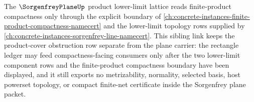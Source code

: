 The $\SorgenfreyPlaneUp$ product lower-limit lattice reads finite-product compactness only through the explicit boundary of \autoref{ch:concrete-instances-finite-product-compactness-namecert} and the lower-limit topology rows supplied by \autoref{ch:concrete-instances-sorgenfrey-line-namecert}. This sibling link keeps the product-cover obstruction row separate from the plane carrier: the rectangle ledger may feed compactness-facing consumers only after the two lower-limit component rows and the finite-product compactness boundary have been displayed, and it still exports no metrizability, normality, selected basis, host powerset topology, or compact finite-net certificate inside the Sorgenfrey plane packet.
